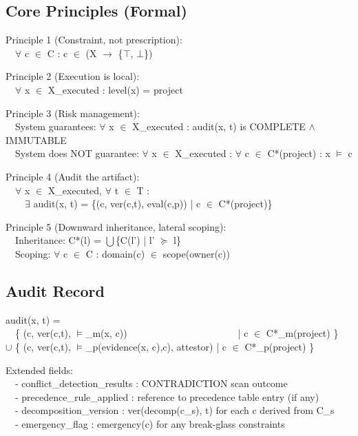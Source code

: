 \subsection{Core Principles (Formal)}
\label{sec:formal-model-A-1-11}


\begin{claddisp}
Principle 1 (Constraint, not prescription):\\
~~$\forall$ c $\in$ C : c $\in$ (X $\to$ \{$\top$, $\bot$\})
\par\smallskip
Principle 2 (Execution is local):\\
~~$\forall$ x $\in$ X\_executed : level(x) = project
\par\smallskip
Principle 3 (Risk management):\\
~~System guarantees: $\forall$ x $\in$ X\_executed : audit(x, t) is COMPLETE $\wedge$ IMMUTABLE\\
~~System does NOT guarantee: $\forall$ x $\in$ X\_executed : $\forall$ c $\in$ C*(project) : x $\vDash$ c
\par\smallskip
Principle 4 (Audit the artifact):\\
~~$\forall$ x $\in$ X\_executed, $\forall$ t $\in$ T :\\
~~~~$\exists$ audit(x, t) = \{(c, ver(c,t), eval(c,p)) | c $\in$ C*(project)\}
\par\smallskip
Principle 5 (Downward inheritance, lateral scoping):\\
~~Inheritance: C*(l) = $\bigcup$\{C(l') | l' $\succeq$ l\}\\
~~Scoping: $\forall$ c $\in$ C : domain(c) $\in$ scope(owner(c))
\end{claddisp}


\subsection{Audit Record}
\label{sec:formal-model-A-1-12}


\begin{claddisp}
audit(x, t) =\\
~~\{ (c, ver(c,t), $\vDash$\_m(x, c))~~~~~~~~~~~~~~~~~~~~~~~| c $\in$ C*\_m(project) \}\\
$\cup$ \{ (c, ver(c,t), $\vDash$\_p(evidence(x, c),c), attestor) | c $\in$ C*\_p(project) \}
\par\smallskip
Extended fields:\\
~~- conflict\_detection\_results : CONTRADICTION scan outcome\\
~~- precedence\_rule\_applied : reference to precedence table entry (if any)\\
~~- decomposition\_version : ver(decomp(c\_s), t) for each c derived from C\_s\\
~~- emergency\_flag : emergency(c) for any break-glass constraints
\end{claddisp}


